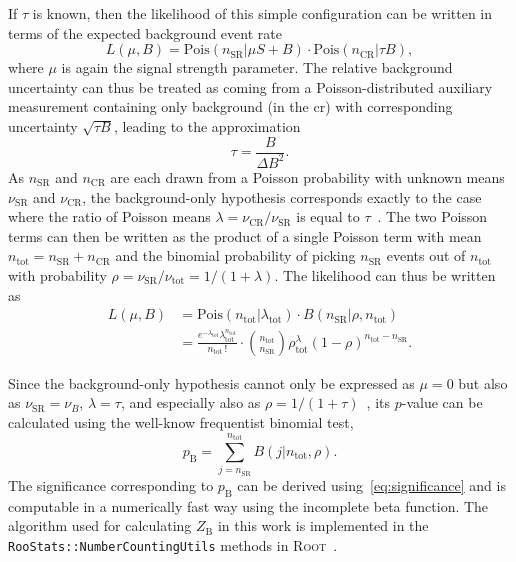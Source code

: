 If $\tau$ is known, then the likelihood of this simple configuration can be written in terms of the expected background event rate
\begin{equation}
	L (\mu,B) = \mathrm{Pois}(n_{\mathrm{SR}}\vert\mu S + B) \cdot \mathrm{Pois}(n_{\mathrm{CR}}\vert\tau B),
\end{equation} 
where $\mu$ is again the signal strength parameter. The relative background uncertainty can thus be treated as coming from a Poisson-distributed auxiliary measurement containing only background (\ie in the \gls{cr}) with corresponding uncertainty $\sqrt{\tau B}$, leading to the approximation
\begin{equation}
	\tau = \frac{B}{\Delta B^2}.
\end{equation}
As $n_{\mathrm{SR}}$ and $n_{\mathrm{CR}}$ are each drawn from a Poisson probability with unknown means $\nu_\mathrm{SR}$ and $\nu_\mathrm{CR}$, the background-only hypothesis corresponds exactly to the case where the ratio of Poisson means $\lambda = \nu_\mathrm{CR} / \nu_\mathrm{SR}$ is equal to $\tau$~\cite{Cousins:2007bmb}. The two Poisson terms can then be written as the product of a single Poisson term with mean $n_\mathrm{tot} = n_\mathrm{SR} + n_\mathrm{CR}$ and the binomial probability of picking $n_\mathrm{SR}$ events out of $n_\mathrm{tot}$ with probability $\rho = \nu_\mathrm{SR} / \nu_\mathrm{tot} = 1 / (1+\lambda)$. The likelihood can thus be written as
\begin{equation}
\begin{split}
	L(\mu, B) & = \mathrm{Pois} (n_\mathrm{tot}\vert\lambda_\mathrm{tot})\cdot B(n_\mathrm{SR}\vert\rho,n_\mathrm{tot}) \\ 
	& = \frac{e^{-\lambda_\mathrm{tot}}\lambda_{\mathrm{tot}}^{n_\mathrm{tot}}}{n_\mathrm{tot}\,!} \cdot{n_\mathrm{tot}\choose n_\mathrm{SR}} \rho^\lambda_\mathrm{tot} (1-\rho)^{n_\mathrm{tot}-n_\mathrm{SR}}.
\end{split}
\end{equation}

Since the background-only hypothesis cannot only be expressed as $\mu = 0$ but also as $\nu_\mathrm{SR} = \nu_B$, $\lambda = \tau$, and especially also as $\rho = 1/(1+\tau)$~\cite{Cousins:2007bmb}, its $p$-value can be calculated using the well-know frequentist binomial test,
\begin{equation}
	p_\mathrm{B} = \sum_{j=n_\mathrm{SR}}^{n_\mathrm{tot}} B (j\vert n_\mathrm{tot}, \rho).
\end{equation}
The significance corresponding to $p_\mathrm{B}$ can be derived using~\cref{eq:significance} and is computable in a numerically fast way using the incomplete beta function. The algorithm used for calculating $Z_\mathrm{B}$ in this work is implemented in the \texttt{RooStats::NumberCountingUtils} methods in \textsc{Root}~\cite{ROOT:1997pa,ROOT-2}.



